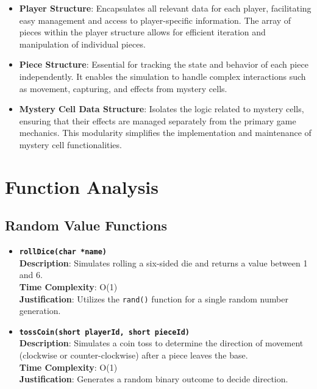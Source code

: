 \documentclass{article}
\begin{document}
    \begin{itemize}
        \item \textbf{Player Structure}: Encapsulates all relevant data for each player, facilitating easy management and access to player-specific information. The array of pieces within the player structure allows for efficient iteration and manipulation of individual pieces.
        
        \item \textbf{Piece Structure}: Essential for tracking the state and behavior of each piece independently. It enables the simulation to handle complex interactions such as movement, capturing, and effects from mystery cells.
        
        \item \textbf{Mystery Cell Data Structure}: Isolates the logic related to mystery cells, ensuring that their effects are managed separately from the primary game mechanics. This modularity simplifies the implementation and maintenance of mystery cell functionalities.
    \end{itemize}
    
    \section{Function Analysis}
    
    \subsection{Random Value Functions}
    
    \begin{itemize}
        \item \textbf{\texttt{rollDice(char *name)}}\\
        \textbf{Description}: Simulates rolling a six-sided die and returns a value between 1 and 6.\\
        \textbf{Time Complexity}: O(1)\\
        \textbf{Justification}: Utilizes the \texttt{rand()} function for a single random number generation.
        
        \item \textbf{\texttt{tossCoin(short playerId, short pieceId)}}\\
        \textbf{Description}: Simulates a coin toss to determine the direction of movement (clockwise or counter-clockwise) after a piece leaves the base.\\
        \textbf{Time Complexity}: O(1)\\
        \textbf{Justification}: Generates a random binary outcome to decide direction.
    \end{itemize}
    
\end{document}
